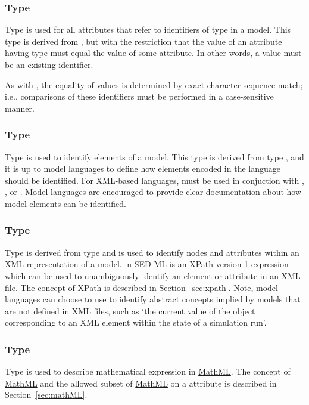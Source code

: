 \subsubsection[\SIdRef]{Type \SIdRef}
\label{type:sidref}
Type  is used for all attributes that refer to identifiers of type \SId in a model. This type is derived from \SId, but with the restriction that the value of an attribute having type  must equal the value of some \SId attribute. In other words, a  value must be an existing identifier.

As with \SId, the equality of  values is determined by exact character sequence match; i.e., comparisons of these identifiers must be performed in a case-sensitive manner.

\subsubsection[\element{TargetType}]{Type }
\label{type:target}
Type  is used to identify elements of a model.  This type is derived from type , and it is up to model languages to define how elements encoded in the language should be identified.  For XML-based languages,  must be used in conjuction with \ChangeXML, \AddXML, or \RemoveXML. Model languages are encouraged to provide clear documentation about how model elements can be identified.

\subsubsection[\element{XPath}]{Type }
\label{type:xpath}
Type  is derived from type  and is used to identify nodes and attributes within an XML representation of a model.  in SED-ML is an \hyperref[sec:xpath]{XPath} version 1 expression which can be used to unambiguously identify an element or attribute in an XML file. The concept of \hyperref[sec:xpath]{XPath} is described in Section~\ref{sec:xpath}.  Note, model languages can choose to use  to identify abstract concepts implied by models that are not defined in XML files, such as `the current value of the object corresponding to an XML element within the state of a simulation run'.

\subsubsection[\element{MathML}]{Type }
\label{type:mathml}
Type  is used to describe mathematical expression in \hyperref[sec:mathML]{MathML}. The concept of \hyperref[sec:mathML]{MathML} and the allowed subset of \hyperref[sec:mathML]{MathML} on a  attribute is described in Section~\ref{sec:mathML}.


